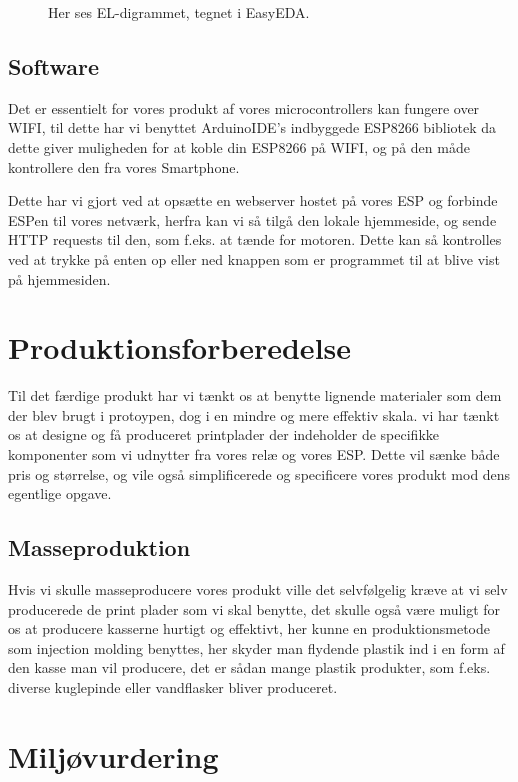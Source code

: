 \documentclass[11pt]{article}
\begin{document}
\begin{figure}[htbp]
    \centering
    \caption{Her ses EL-digrammet, tegnet i EasyEDA. }
    \end{figure}

\subsection{Software}
Det er essentielt for vores produkt af vores microcontrollers kan fungere over WIFI, til dette har vi benyttet ArduinoIDE's indbyggede ESP8266 bibliotek da dette giver muligheden for at koble din ESP8266 på WIFI, og på den måde kontrollere den fra vores Smartphone. 

Dette har vi gjort ved at opsætte en webserver hostet på vores ESP og forbinde ESPen til vores netværk, herfra kan vi så tilgå den lokale hjemmeside, og sende HTTP requests til den, som f.eks. at tænde for motoren. Dette kan så kontrolles ved at trykke på enten op eller ned knappen som er programmet til at blive vist på hjemmesiden.

\section{Produktionsforberedelse}
\label{sec:orge880538}
Til det færdige produkt har vi tænkt os at benytte lignende materialer som dem der blev brugt i protoypen, dog i en mindre og mere effektiv skala. vi har tænkt os at designe og få produceret printplader der indeholder de specifikke komponenter som vi udnytter fra vores relæ og vores ESP. Dette vil sænke både pris og størrelse, og vile også simplificerede og specificere vores produkt mod dens egentlige opgave. 


\subsection{Masseproduktion}
\label{sec:orge66eada}
Hvis vi skulle masseproducere vores produkt ville det selvfølgelig kræve at vi selv producerede de print plader som vi skal benytte, det skulle også være muligt for os at producere kasserne hurtigt og effektivt, her kunne en produktionsmetode som injection molding benyttes, her skyder man flydende plastik ind i en form af den kasse man vil producere, det er sådan mange plastik produkter, som f.eks. diverse kuglepinde eller vandflasker bliver produceret.

\newpage
\section{Miljøvurdering}
\label{sec:miljoevurdering}
\end{document}
